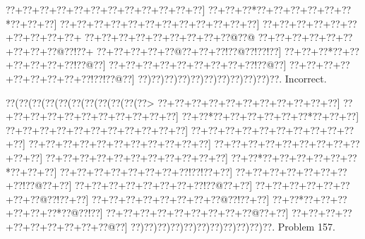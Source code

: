 \documentclass[a5paper]{article}
\begin{document}
\begin{center}
{\goo
\0??+\0??+\0??+\0??+\0??+\0??+\0??+\0??+\0??+\0??+\0??+\0??]
\0??+\0??+\0??*\0??+\0??+\0??+\0??+\0??+\0??*\0??+\0??+\0??]
\0??+\0??+\0??+\0??+\0??+\0??+\0??+\0??+\0??+\0??+\0??+\0??]
\0??+\0??+\0??+\0??+\0??+\0??+\0??+\0??+\0??+\0??+
\0??+\0??+\0??+\0??+\0??+\0??+\0??+\0??+\0??@\0??@
\0??+\0??+\0??+\0??+\0??+\0??+\0??+\0??+\0??@\0??!\0??+
\0??+\0??+\0??+\0??+\0??@\0??+\0??+\0??!\0??@\0??!\0??!\0??]
\0??+\0??+\0??*\0??+\0??+\0??+\0??+\0??+\0??!\0??@\0??]
\0??+\0??+\0??+\0??+\0??+\0??+\0??+\0??+\0??!\0??@\0??]
\0??+\0??+\0??+\0??+\0??+\0??+\0??+\0??+\0??!\0??!\0??@\0??]
\0??)\0??)\0??)\0??)\0??)\0??)\0??)\0??)\0??)\0??)\0??.
}
Incorrect. 

\end{center}
\newpage
\begin{center}
{\goo
\0??(\0??(\0??(\0??(\0??(\0??(\0??(\0??(\0??(\0??(\0??>
\0??+\0??+\0??+\0??+\0??+\0??+\0??+\0??+\0??+\0??+\0??]
\0??+\0??+\0??+\0??+\0??+\0??+\0??+\0??+\0??+\0??+\0??]
\0??+\0??*\0??+\0??+\0??+\0??+\0??+\0??*\0??+\0??+\0??]
\0??+\0??+\0??+\0??+\0??+\0??+\0??+\0??+\0??+\0??+\0??]
\0??+\0??+\0??+\0??+\0??+\0??+\0??+\0??+\0??+\0??+\0??]
\0??+\0??+\0??+\0??+\0??+\0??+\0??+\0??+\0??+\0??+\0??]
\0??+\0??+\0??+\0??+\0??+\0??+\0??+\0??+\0??+\0??+\0??]
\0??+\0??+\0??+\0??+\0??+\0??+\0??+\0??+\0??+\0??+\0??]
\0??+\0??*\0??+\0??+\0??+\0??+\0??+\0??*\0??+\0??+\0??]
\0??+\0??+\0??+\0??+\0??+\0??+\0??+\0??!\0??!\0??+\0??]
\0??+\0??+\0??+\0??+\0??+\0??+\0??+\0??!\0??@\0??+\0??]
\0??+\0??+\0??+\0??+\0??+\0??+\0??+\0??!\0??@\0??+\0??]
\0??+\0??+\0??+\0??+\0??+\0??+\0??+\0??@\0??!\0??+\0??]
\0??+\0??+\0??+\0??+\0??+\0??+\0??+\0??@\0??!\0??+\0??]
\0??+\0??*\0??+\0??+\0??+\0??+\0??+\0??*\0??@\0??!\0??]
\0??+\0??+\0??+\0??+\0??+\0??+\0??+\0??+\0??@\0??+\0??]
\0??+\0??+\0??+\0??+\0??+\0??+\0??+\0??+\0??+\0??@\0??]
\0??)\0??)\0??)\0??)\0??)\0??)\0??)\0??)\0??)\0??)\0??.
}
Problem 157.

\end{center}
\end{document}
